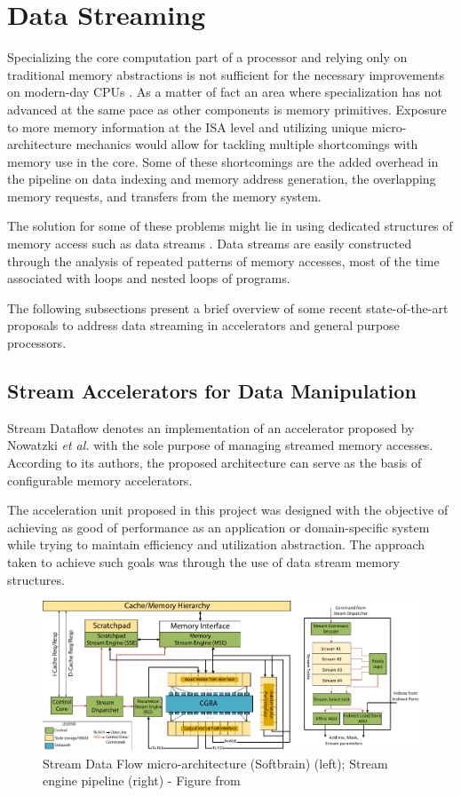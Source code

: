 \section{Data Streaming}
Specializing the core computation part of a processor and relying only on traditional memory abstractions is not sufficient for the necessary improvements on modern-day CPUs \cite{8192490}. As a matter of fact an area where specialization has not advanced at the same pace as other components is memory primitives. Exposure to more memory information at the ISA level and utilizing unique micro-architecture mechanics would allow for tackling multiple shortcomings with memory use in the core. Some of these shortcomings are the added overhead in the pipeline on data indexing and memory address generation, the overlapping memory requests, and transfers from the memory system.

The solution for some of these problems might lie in using dedicated structures of memory access such as data streams \cite{8192490}. Data streams are easily constructed through the analysis of repeated patterns of memory accesses, most of the time associated with loops and nested loops of programs.

The following subsections present a brief overview of some recent state-of-the-art proposals to address data streaming in accelerators and general purpose processors.


\subsection{Stream Accelerators for Data Manipulation}
\label{label:stream_dataflow}
Stream Dataflow denotes an implementation of an accelerator proposed by Nowatzki \textit{et al.} \cite{8192490} with the sole purpose of managing streamed memory accesses. According to its authors, the proposed architecture can serve as the basis of configurable memory accelerators.

The acceleration unit proposed in this project was designed with the objective of achieving as good of performance as an application or domain-specific system while trying to maintain efficiency and utilization abstraction. The approach taken to achieve such goals was through the use of data stream memory structures.

\begin{figure}[H]
	\begin{center}
 		\includegraphics[width=0.87\linewidth]{images/stream-dataflow arch.pdf}
 		\caption{Stream Data Flow micro-architecture (Softbrain) (left); Stream engine pipeline (right) - Figure from \cite{8192490}}
 		\label{fig:stream-dataflow_arch}
	\end{center} 
\end{figure}

